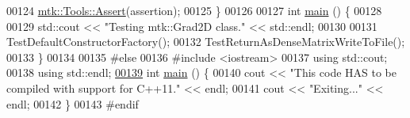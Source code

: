 \begin{DoxyCode}
00124   \hyperlink{classmtk_1_1Tools_aa311fada9255627d06c56b1e4fedce9e}{mtk::Tools::Assert}(assertion);
00125 \}
00126 
00127 \textcolor{keywordtype}{int} \hyperlink{mtk__grad__2d__test_8cc_ae66f6b31b5ad750f1fe042a706a4e3d4}{main} () \{
00128 
00129   std::cout << \textcolor{stringliteral}{"Testing mtk::Grad2D class."} << std::endl;
00130 
00131   TestDefaultConstructorFactory();
00132   TestReturnAsDenseMatrixWriteToFile();
00133 \}
00134 
00135 \textcolor{preprocessor}{#else}
00136 \textcolor{preprocessor}{#include <iostream>}
00137 \textcolor{keyword}{using} std::cout;
00138 \textcolor{keyword}{using} std::endl;
\hypertarget{mtk__grad__2d__test_8cc_source_l00139}{}\hyperlink{mtk__grad__2d__test_8cc_ae66f6b31b5ad750f1fe042a706a4e3d4}{00139} \textcolor{keywordtype}{int} \hyperlink{mtk__grad__2d__test_8cc_ae66f6b31b5ad750f1fe042a706a4e3d4}{main} () \{
00140   cout << \textcolor{stringliteral}{"This code HAS to be compiled with support for C++11."} << endl;
00141   cout << \textcolor{stringliteral}{"Exiting..."} << endl;
00142 \}
00143 \textcolor{preprocessor}{#endif}
\end{DoxyCode}
